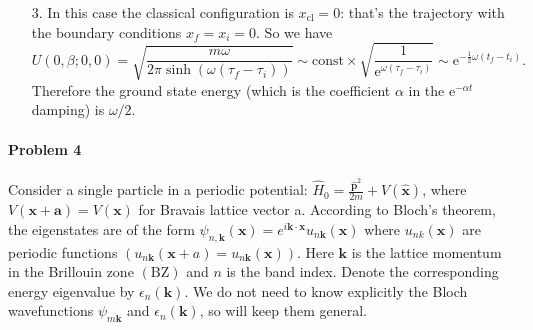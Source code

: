 \documentclass[hyperref, a4paper]{article}
\newcommand*{\ee}{\mathrm{e}}
\begin{document}
\begin{itemize}
\item[3.] In this case the classical configuration is $x_{\text{cl}} = 0$:
that's the trajectory with the boundary conditions $x_f = x_i = 0$.
So we have 
\begin{equation}
    U(0, \beta; 0, 0) = \sqrt{\frac{m \omega}{2 \pi \sinh (\omega (\tau_f - \tau_i))}} \sim 
    \text{const} \times \sqrt{\frac{1}{\ee^{\omega (\tau_f - \tau_i)}}} \sim \ee^{- \frac{1}{2} \omega (t_f - t_i)} .
\end{equation}
Therefore the ground state energy 
(which is the coefficient $\alpha$ in the $\ee^{- \alpha t}$ damping) is $\omega / 2$.

\end{itemize}

\paragraph{Problem 4} Consider a single particle in a periodic potential: $\hat{H}_0=\frac{\hat{\mathbf{p}}^2}{2 m}+V(\hat{\mathbf{x}})$, where $V(\mathbf{x}+\mathbf{a})=V(\mathbf{x})$ for Bravais lattice vector a. According to Bloch's theorem, the eigenstates are of the form $\psi_{n, \mathbf{k}}(\mathbf{x})=e^{i \mathbf{k} \cdot \mathbf{x}} u_{n \mathbf{k}}(\mathbf{x})$ where $u_{n k}(\mathbf{x})$ are periodic functions $\left(u_{n \mathbf{k}}(\mathbf{x}+a)=u_{n \mathbf{k}}(\mathbf{x})\right)$. Here $\mathbf{k}$ is the lattice momentum in the Brillouin zone $(\mathrm{BZ})$ and $n$ is the band index. Denote the corresponding energy eigenvalue by $\epsilon_n(\mathbf{k})$. We do not need to know explicitly the Bloch wavefunctions $\psi_{m \mathbf{k}}$ and $\epsilon_n(\mathbf{k})$, so will keep them general.
\end{document}
